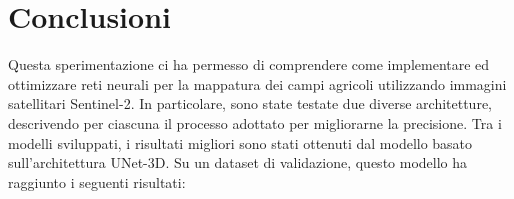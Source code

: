 \chapter{Conclusioni}
Questa sperimentazione ci ha permesso di comprendere come implementare ed 
ottimizzare reti neurali per la mappatura dei campi agricoli utilizzando 
immagini satellitari Sentinel-2.
In particolare, sono state testate due diverse architetture, descrivendo per 
ciascuna il processo adottato per migliorarne la precisione. 
Tra i modelli sviluppati, i risultati migliori sono stati ottenuti dal modello 
basato sull'architettura UNet-3D. Su un dataset di validazione, questo modello ha 
raggiunto i seguenti risultati:

